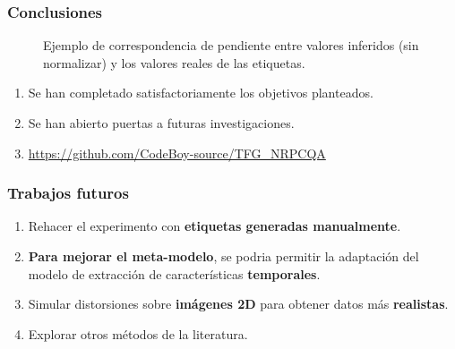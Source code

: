 \begin{frame}
    \frametitle{Conclusiones}
\begin{figure}
  \vspace{-.5cm}
  \hspace{-.2cm}\hspace{.2cm}
  \hspace{.2cm}
  \caption{Ejemplo de correspondencia de pendiente entre valores inferidos (sin normalizar) y 
  los valores reales de las etiquetas.} 
  \label{fig:Cualitativos}
\end{figure}
\vspace{-.5cm}
\begin{enumerate}[<+->]
  \item Se han completado satisfactoriamente los objetivos planteados.
  \item Se han abierto puertas a futuras investigaciones.
  \item \url{https://github.com/CodeBoy-source/TFG_NRPCQA} 
\end{enumerate}
\end{frame}

\begin{frame}
  \frametitle{Trabajos futuros}
  \begin{enumerate}
    \item Rehacer el experimento con \textbf{etiquetas generadas manualmente}. 
    \item \textbf{Para mejorar el meta-modelo}, se podria \alert{permitir la adaptación} del modelo de extracción de características \textbf{temporales}.
    \item Simular distorsiones sobre \textbf{imágenes 2D} para obtener datos más \textbf{realistas}.
    \item Explorar \alert{otros métodos} de la literatura. 
  \end{enumerate}
\end{frame}


